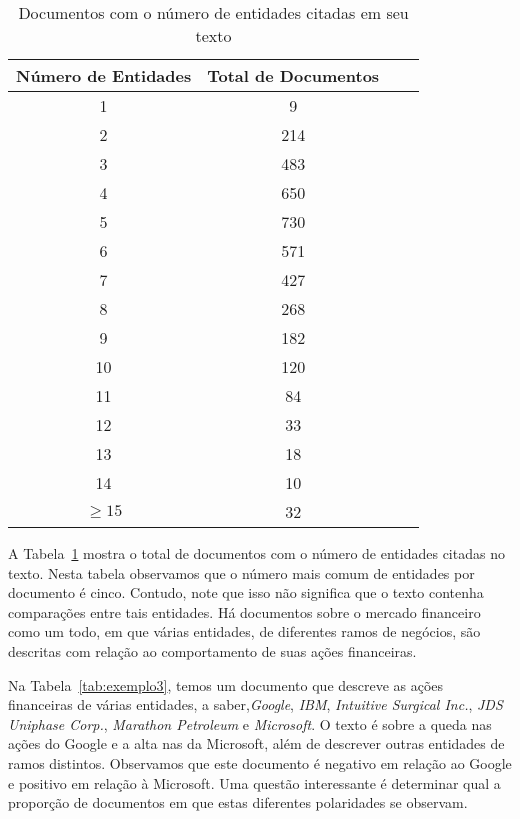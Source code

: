 \documentclass[a4paper,12pt]{article}
\begin{document}
\begin{table}
\begin{center}
    \begin{tabular}{ | c | c | c | p{8cm} |}
    \hline
    Número de Entidades & Total de Documentos \\ \hline
    1 & 9 \\ \hline
    2 & 214 \\ \hline
    3 & 483 \\ \hline
    4 & 650 \\ \hline
    5 & 730 \\ \hline
    6 & 571 \\ \hline
    7 & 427 \\ \hline
    8 & 268 \\ \hline
    9 & 182 \\ \hline
    10 & 120 \\ \hline
    11 & 84 \\ \hline
    12 & 33 \\ \hline
    13 & 18 \\ \hline
    14 & 10 \\ \hline
    $\geq 15$ & 32 \\ 
    \hline
    \end{tabular}
  \caption{Documentos com o número de entidades citadas em seu texto}
  \label{tab:entidades}
\end{center}
\end{table}

A Tabela~\ref{tab:entidades} mostra o total de documentos com o número de entidades citadas no texto. Nesta tabela observamos que o número mais comum de entidades por documento é cinco. Contudo, note que isso não significa que o texto contenha comparações entre tais entidades. Há documentos sobre o mercado financeiro como um todo, em que várias entidades, de diferentes ramos de negócios, são descritas com relação ao comportamento de suas ações financeiras.

Na Tabela~\ref{tab:exemplo3}, temos um documento que descreve as ações financeiras de várias entidades, a saber,\textit{Google}, \textit{IBM}, \textit{Intuitive Surgical Inc.}, \textit{JDS Uniphase Corp.}, \textit{Marathon Petroleum} e \textit{Microsoft}. O texto é sobre a queda nas ações do Google e a alta nas da Microsoft, além de descrever outras entidades de ramos distintos. Observamos que este documento é negativo em relação ao Google e positivo em relação à Microsoft. Uma questão interessante é determinar qual a proporção de documentos em que estas diferentes polaridades se observam. 
\end{document}
